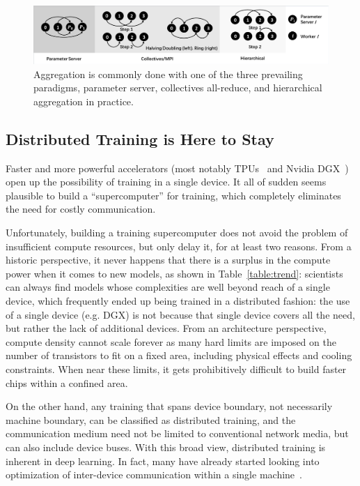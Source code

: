 \begin{figure}[t!]
	\centering
	\includegraphics[width=\linewidth, trim=2 3 3 3,clip]{Figures/aggregationapproaches.pdf}
	\caption{Aggregation is commonly done with one of the three prevailing paradigms, parameter server, collectives all-reduce, and hierarchical aggregation in practice.}
	\label{fig:aggregationapproaches}
\end{figure}

\subsection{Distributed Training is Here to Stay}
Faster and more powerful accelerators (most notably TPUs~\cite{Jouppi:2017:IPA:3079856.3080246} and Nvidia DGX~\cite{AIResear61:online}) open up the possibility of training in a single device. It all of sudden seems plausible to build a ``supercomputer'' for training, which completely eliminates the need for costly communication. 

Unfortunately, building a training supercomputer does not avoid the problem of insufficient compute resources, but only delay it, for at least two reasons. From a historic perspective, it never happens that there is a surplus in the compute power when it comes to new models, as shown in Table~\ref{table:trend}: scientists can always find models whose complexities are well beyond reach of a single device, which frequently ended up being trained in a distributed fashion: the use of a single device (e.g. DGX) is not because that single device covers all the need, but rather the lack of additional devices. From an architecture perspective, compute density cannot scale forever as many hard limits are imposed on the number of transistors to fit on a fixed area, including physical effects and cooling constraints. When near these limits, it gets prohibitively difficult to build faster chips within a confined area. 

On the other hand, any training that spans device boundary, not necessarily machine boundary, can be classified as distributed training, and the communication medium need not be limited to conventional network media, but can also include device buses. With this broad view, distributed training is inherent in deep learning. In fact, many have already started looking into optimization of inter-device communication within a single machine~\cite{wang2019blink}. %


